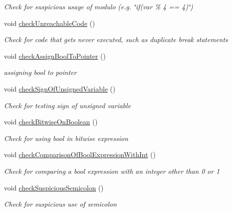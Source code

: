 \begin{DoxyCompactItemize}
\begin{DoxyCompactList}\small\item\em Check for suspicious usage of modulo (e.\-g. \char`\"{}if(var \% 4 == 4)\char`\"{}) \end{DoxyCompactList}\item 
void \hyperlink{class_check_other_a93ea6c116fd55f6da83c3e5b143ac46a}{check\-Unreachable\-Code} ()
\begin{DoxyCompactList}\small\item\em Check for code that gets never executed, such as duplicate break statements \end{DoxyCompactList}\item 
void \hyperlink{class_check_other_a1065f2d88d606adf8c8f084962843574}{check\-Assign\-Bool\-To\-Pointer} ()
\begin{DoxyCompactList}\small\item\em assigning bool to pointer \end{DoxyCompactList}\item 
void \hyperlink{class_check_other_abd9524c5229935fcc89558554cff065d}{check\-Sign\-Of\-Unsigned\-Variable} ()
\begin{DoxyCompactList}\small\item\em Check for testing sign of unsigned variable \end{DoxyCompactList}\item 
void \hyperlink{class_check_other_a81e2f14a1a0b235a5f99b70bdebb45da}{check\-Bitwise\-On\-Boolean} ()
\begin{DoxyCompactList}\small\item\em Check for using bool in bitwise expression \end{DoxyCompactList}\item 
void \hyperlink{class_check_other_a85a61547fb688c8bf64ce67cf4d18da2}{check\-Comparison\-Of\-Bool\-Expression\-With\-Int} ()
\begin{DoxyCompactList}\small\item\em Check for comparing a bool expression with an integer other than 0 or 1 \end{DoxyCompactList}\item 
void \hyperlink{class_check_other_a6fc42aee5f8cb713dca62ac55ce87f0b}{check\-Suspicious\-Semicolon} ()
\begin{DoxyCompactList}\small\item\em Check for suspicious use of semicolon \end{DoxyCompactList}\item 

\end{DoxyCompactItemize}
